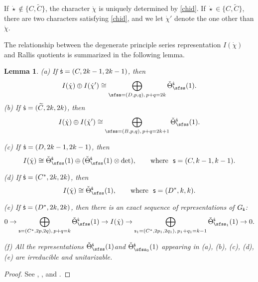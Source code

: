 \documentclass[12pt,a4paper]{amsart}
\numberwithin{equation}{section}
\newtheorem{lem}[thm]{Lemma}
\theoremstyle{remark}
\begin{document}
If  $\dot \star\notin \{C, \widetilde C\}$, the character   $\dot{\chi}$ is uniquely determined by \eqref{chid}.
If  $\dot \star\in \{C, \widetilde C\}$, there are two characters satisfying \eqref{chid}, and we let $\dot \chi'$ denote the one other than $\dot \chi$.


The relationship between the degenerate principle series representation $I(\dot{\chi})$ and
Rallis quotients is summarized in the following lemma.
\begin{lem}\label{degens}%
\noindent
(a) If ${\dot{\mathsf s}}=(C,2k-1, 2k-1)$,  then
\[
  I(\dot{\chi}) \oplus I(\dot \chi')\cong \bigoplus_{\sfss=(D,p,q), \, p+q=2k}
   \check \Theta_{\sfss}^{\dsfss}(1).
\]
\noindent
(b) If ${\dot{\mathsf s}}=(\widetilde C,2k,2k)$,  then
\[
   I(\dot{\chi}) \oplus I(\dot \chi')\cong \bigoplus_{\sfss=(B,p,q), \, p+q=2k+1}   \check \Theta_{\sfss}^{\dsfss}(1).
\]

\noindent
(c) If ${\dot{\mathsf s}}=(D,2k-1,2k-1)$, then
\[
  I(\dot{\chi})\cong \check \Theta_{\sfss}^{\dsfss}(1)\oplus  (\check \Theta_{\sfss}^{\dsfss}(1)\otimes \det),\qquad \textrm{where } \ \mathsf s=(C, k-1, k-1).
\]


\noindent
(d) If ${\dot{\mathsf s}}=(C^*,2k,2k)$, then
\[
  I(\dot{\chi})\cong \check \Theta_{\sfss}^{\dsfss}(1),\qquad \textrm{where }\ \mathsf s=(D^*, k, k).
\]


\noindent
(e) If ${\dot{\mathsf s}}=(D^*,2k,2k)$, then there is an exact sequence of representations of $G_{{\dot{\mathsf s}}}$:
\[
0\rightarrow \bigoplus_{\mathsf s=(C^*, 2p, 2q), \, p+q=k} \check \Theta_{\sfss}^{\dsfss}(1) \rightarrow
 I(\dot{\chi})\rightarrow  \bigoplus_{\mathsf s_1=(C^*, 2p_1, 2q_1), \, p_1+q_1=k-1} \check \Theta_{\sfss_1}^{\dsfss}(1) \rightarrow 0.
\]

\noindent
(f) All the representations $ \check \Theta_{\sfss}^{\dsfss}(1) $and $ \check \Theta_{\sfss_0}^{\dsfss}(1)$ appearing in (a), (b), (c), (d), (e) are irreducible and unitarizable.


\end{lem}
\begin{proof}
 See \cite[Theorem 2.4]{Ku}, \cite[Introduction]{LZ1}, \cite[Theorem 6.1]{LZ2} and  \cite[Sections 9 and 10]{Ya}.
\end{proof}
\end{document}
